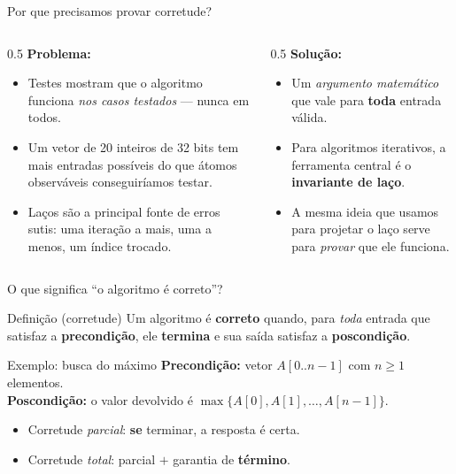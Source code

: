 \documentclass[aspectratio=169]{beamer}
\begin{document}
\begin{frame}{Por que precisamos provar corretude?}
  \begin{columns}[T]
    \begin{column}{0.5\textwidth}
      \textbf{Problema:}
      \begin{itemize}
        \item Testes mostram que o algoritmo funciona \emph{nos casos testados} --- nunca em todos.
        \item Um vetor de 20 inteiros de 32 bits tem mais entradas possíveis do que átomos observáveis conseguiríamos testar.
        \item Laços são a principal fonte de erros sutis: uma iteração a mais, uma a menos, um índice trocado.
      \end{itemize}
    \end{column}
    \begin{column}{0.5\textwidth}
      \textbf{Solução:}
      \begin{itemize}
        \item Um \emph{argumento matemático} que vale para \textbf{toda} entrada válida.
        \item Para algoritmos iterativos, a ferramenta central é o \textbf{invariante de laço}.
        \item A mesma ideia que usamos para projetar o laço serve para \emph{provar} que ele funciona.
      \end{itemize}
    \end{column}
  \end{columns}
\end{frame}

\begin{frame}{O que significa ``o algoritmo é correto''?}
  \begin{block}{Definição (corretude)}
    Um algoritmo é \textbf{correto} quando, para \emph{toda} entrada que satisfaz a
    \textbf{precondição}, ele \textbf{termina} e sua saída satisfaz a \textbf{poscondição}.
  \end{block}
  \begin{exampleblock}{Exemplo: busca do máximo}
    \textbf{Precondição:} vetor $A[0..n-1]$ com $n \geq 1$ elementos.\\
    \textbf{Poscondição:} o valor devolvido é $\max\{A[0], A[1], \ldots, A[n-1]\}$.
  \end{exampleblock}
  \begin{itemize}
    \item Corretude \emph{parcial}: \textbf{se} terminar, a resposta é certa.
    \item Corretude \emph{total}: parcial $+$ garantia de \textbf{término}.
  \end{itemize}
\end{frame}
\end{document}
